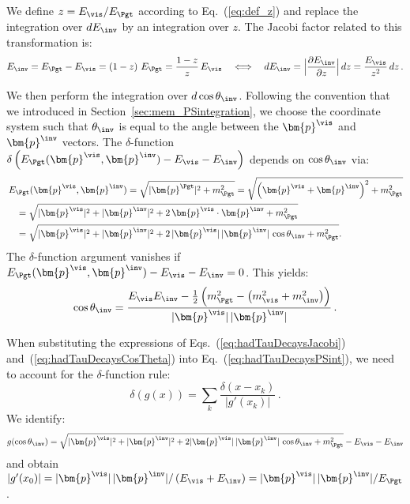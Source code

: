 We define $z = E_{\vis}/E_{\Pgt}$ according to Eq.~(\ref{eq:def_z}) and replace the integration over $dE_{\inv}$ by an integration over $z$.
The Jacobi factor related to this transformation is:
\begin{equation}
E_{\inv} = E_{\Pgt} - E_{\vis} = \left( 1 - z \right)
\, E_{\Pgt} = \frac{1 - z}{z} \, E_{\vis}
  \quad \Longleftrightarrow \quad dE_{\inv} = \Big\lvert \frac{\partial E_{\inv}}{\partial z} \Big\rvert \, dz = \frac{E_{\vis}}{z^{2}} \, dz \, .
\label{eq:hadTauDecaysJacobi}
\end{equation}

We then perform the integration over $d\cos\theta_{\inv}$.
Following the convention that we introduced in Section~\ref{sec:mem_PSintegration}, we choose the coordinate system such that
$\theta_{\inv}$ is equal to the angle between the $\bm{p}^{\vis}$ and $\bm{p}^{\inv}$ vectors.
The $\delta$-function $\delta \left( E_{\Pgt}(\bm{p}^{\vis}, \bm{p}^{\inv}) - E_{\vis} - E_{\inv} \right)$ depends on $\cos\theta_{\inv}$ via:
\begin{align}
& \, E_{\Pgt}(\bm{p}^{\vis}, \bm{p}^{\inv}) 
= \sqrt{\vert\bm{p}^{\Pgt}\vert^{2} + m^{2}_{\Pgt}} = \sqrt{\left( \bm{p}^{\vis} + \bm{p}^{\inv} \right)^2 + m^{2}_{\Pgt}} \nonumber \\
& \quad = \sqrt{\vert\bm{p}^{\vis}\vert^{2} +
  \vert\bm{p}^{\inv}\vert^{2} + 2 \, \bm{p}^{\vis}
  \cdot \bm{p}^{\inv} + m^{2}_{\Pgt}} \nonumber \\
& \quad = \sqrt{\vert\bm{p}^{\vis}\vert^{2} +
  \vert\bm{p}^{\inv}\vert^{2} + 2 \, \vert\bm{p}^{\vis}\vert \, \vert\bm{p}^{\inv}\vert \, \cos\theta_{\inv} + m^{2}_{\Pgt}}.
\end{align}
The $\delta$-function argument vanishes if $E_{\Pgt}(\bm{p}^{\vis}, \bm{p}^{\inv}) - E_{\vis} - E_{\inv} = 0$. 
This yields:
\begin{equation}
\cos\theta_{\inv} 
  = \frac{E_{\vis} E_{\inv} - \frac{1}{2} \left(m^{2}_{\Pgt} - \left(
        m^{2}_{\vis} + m^{2}_{\inv} \right)
    \right)}{\vert\bm{p}^{\vis}\vert \, \vert\bm{p}^{\inv}\vert} \, .
\label{eq:hadTauDecaysCosTheta}
\end{equation}

When substituting the expressions of Eqs.~(\ref{eq:hadTauDecaysJacobi}) and~(\ref{eq:hadTauDecaysCosTheta}) into Eq.~(\ref{eq:hadTauDecaysPSint}),
we need to account for the $\delta$-function rule:
\begin{equation} 
\delta \left( g(x) \right) = \sum_{k} \frac{\delta \left( x - x_{k}
  \right)}{\vert g'(x_{k}) \vert} \, .
\label{eq:deltaFuncRule}
\end{equation}
We identify:
\begin{equation} 
g(\cos\theta_{\inv}) = \sqrt{\vert\bm{p}^{\vis}\vert^{2} + \vert\bm{p}^{\inv}\vert^{2}
  + 2 \vert\bm{p}^{\vis}\vert \, \vert\bm{p}^{\inv}\vert \,
  \cos\theta_{\inv} + m^{2}_{\Pgt}} - E_{\vis} - E_{\inv}
\end{equation}
and obtain $\vert g'(x_{0}) \vert = \vert\bm{p}^{\vis}\vert \,
\vert\bm{p}^{\inv}\vert / \left( E_{\vis} + E_{\inv} \right) = \vert\bm{p}^{\vis}\vert \,
\vert\bm{p}^{\inv}\vert / E_{\Pgt}$.

